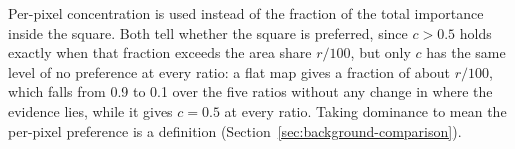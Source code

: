 Per-pixel concentration is used instead of the fraction of the total importance inside
the square. Both tell whether the square is preferred, since $c > 0.5$ holds exactly when
that fraction exceeds the area share $r/100$, but only $c$ has the same level of no
preference at every ratio: a flat map gives a fraction of about $r/100$, which falls from
0.9 to 0.1 over the five ratios without any change in where the evidence lies, while it
gives $c = 0.5$ at every ratio. Taking dominance to mean the per-pixel preference is a
definition (Section~\ref{sec:background-comparison}).
